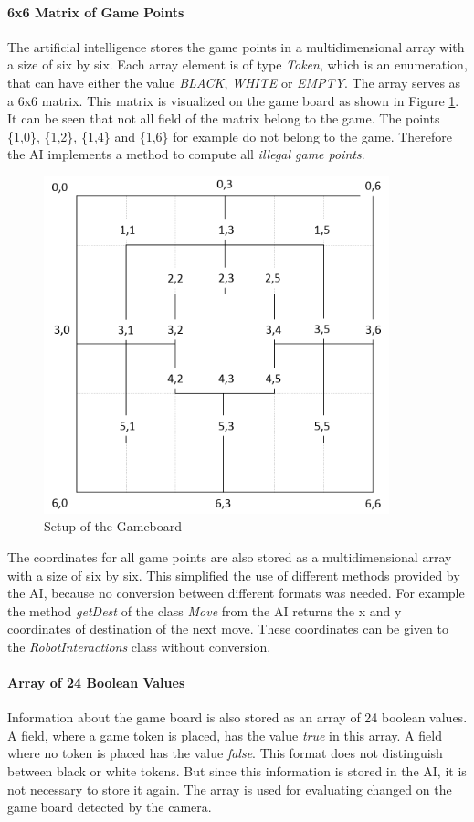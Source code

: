\documentclass[a4paper]{spie}  %
\begin{document}
\begin{large}
\paragraph{6x6 Matrix of Game Points}
The artificial intelligence stores the game points in a multidimensional array with a size of six by six. Each array element is of type \emph{Token}, which is an enumeration, that can have either the value \emph{BLACK}, \emph{WHITE} or \emph{EMPTY}. The array serves as a 6x6 matrix. This matrix is visualized on the game board as shown in Figure \ref{setup_board}. It can be seen that not all field of the matrix belong to the game. The points \{1,0\}, \{1,2\}, \{1,4\} and \{1,6\} for example do not belong to the game. Therefore the AI implements a method to compute all \emph{illegal game points}.\\
\begin{figure}[h]
\includegraphics[width=10cm]{images/setup_board.png}
\centering
\caption{Setup of the Gameboard}
\label{setup_board}
\end{figure}
The coordinates for all game points are also stored as a multidimensional array with a size of six by six. This simplified the use of different methods provided by the AI, because no conversion between different formats was needed. For example the method \emph{getDest} of the class \emph{Move} from the AI returns the x and y coordinates of destination of the next move. These coordinates can be given to the \emph{RobotInteractions} class without conversion.
\paragraph{Array of 24 Boolean Values}
Information about the game board is also stored as an array of 24 boolean values. A field, where a game token is placed, has the value \emph{true} in this array. A field where no token is placed has the value \emph{false}. This format does not distinguish between black or white tokens. But since this information is stored in the AI, it is not necessary to store it again. The array is used for evaluating changed on the game board detected by the camera.


\end{large}
\end{document}
